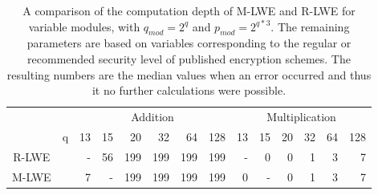 
\begin{table}[h]
  \centering
  \caption[M-LWE and R-LWE computation depth comparison]{A comparison of the computation depth of M-LWE and R-LWE for variable modules, with $q_{mod} = 2^q$ and $p_{mod}=2^{q*3}$. The remaining parameters are based on variables corresponding to the regular or recommended security level of published encryption schemes. The resulting numbers are the median values when an error occurred and thus it no further calculations were possible.}
  
  \begin{tabular}{|cc|rrrrrr|rrrrrr|}
    \toprule
                                       &   & \multicolumn{6}{|c|}{Addition} & \multicolumn{6}{|c|}{Multiplication}                                                        \\
                                       & q & 13                             & 15                                   & 20  & 32  & 64  & 128 & 13 & 15 & 20 & 32 & 64 & 128 \\
    \midrule
    R-LWE  \cite{CyrstalsKyber}        &   & -                              & 56                                   & 199 & 199 & 199 & 199 & -  & 0  & 0  & 1  & 3  & 7   \\
    M-LWE  \cite{PracticalKeyExchange} &   & 7                              & -                                    & 199 & 199 & 199 & 199 & 0  & -  & 0  & 1  & 3  & 7   \\
    \bottomrule
  \end{tabular}
  \label{table:depthComparison}
\end{table}
